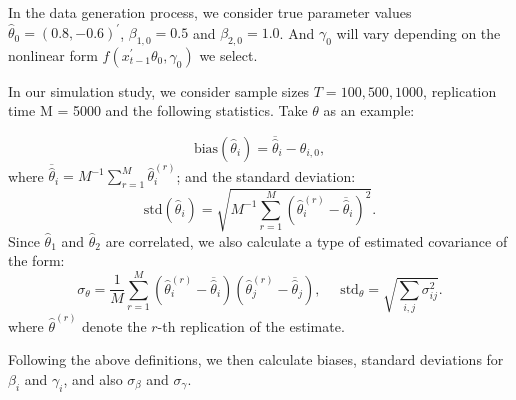 \documentclass[a4paper,12pt,times,numbered,print,index]{report}
\numberwithin{equation}{section}
\begin{document}
	In the data generation process, we consider true parameter values $\hat{\theta}_0 = (0.8, -0.6)^{\prime}$, $\beta_{1,0} = 0.5$ and $\beta_{2,0} = 1.0$. And $\gamma_0$ will vary depending on the nonlinear form $f\left(x_{t-1}^{\prime }\theta _{0},\gamma _{0}\right)$ we select. 
	
	In our simulation study, we consider sample sizes $T = 100, 500,  1000$, replication time M = 5000 and the following statistics. Take $\theta$ as an example:
	
	\[
	\text{bias}({\hat\theta_i})=\overline{\widehat{\theta}}_{i}-\theta _{i,0}, 
	\]%
	where $\overline{\widehat{\theta}}_{i}=M^{-1}\sum_{r=1}^{M}\widehat{\theta}_{i}^{(r)} $; and the standard deviation: 
	\[
	\text{std}({\hat\theta_i}) =\sqrt{M^{-1}\sum_{r=1}^{M}\left( \widehat{\theta}_{i}^{(r)}-\overline{\widehat{\theta}}_{i}\right) ^{2}}. 
	\]%
	Since $\widehat{\theta}_1$ and $\widehat{\theta}_{2}$ are correlated, we also calculate a type of estimated covariance of the form:
	\begin{equation*}
		\label{std of theta}
		\sigma_{\theta}=\frac{1}{M} \sum_{r=1}^{M}\left(\widehat{\theta}_{i}^{(r)}-\overline{\widehat{\theta}}_{i}\right)\left(\widehat{\theta}_{j}^{(r)}-\overline{\widehat{\theta}}_{j}\right), \quad \text { std}_{\theta} = \sqrt{\sum_{i, j} \sigma_{i j}^{2}}.
	\end{equation*}
	where 
	$\widehat{\theta}^{(r)}$ denote the $r$-th replication of the estimate.
	
	Following the above definitions, we then calculate biases, standard deviations for $\beta_i$ and $\gamma_i$, and also $\sigma_{\beta}$ and $\sigma_{\gamma}$.
	
	
\end{document}
